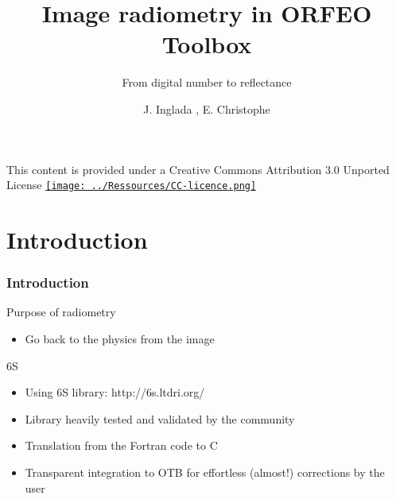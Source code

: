 \documentclass[compress]{beamer}
\title{Image radiometry in ORFEO Toolbox}
\subtitle
{From digital number to reflectance} %
\author
{J. Inglada\inst{1} , E. Christophe\inst{2}}
\institute[Cesbio, Crisp] %
{\inst{1}\textsc{Centre d'Études Spatiales de la Biosphère, Toulouse, France}
\and
\inst{2}\textsc{Centre for Remote Imaging, Sensing and Processing,\\ National University of Singapore}
}
\date{}
\begin{document}
\begin{frame}
  \titlepage
{\tiny This content is provided under a Creative Commons
  Attribution 3.0 Unported License} \href{http://creativecommons.org/licenses/by/3.0/}{\texttt{[image: ../Ressources/CC-licence.png]}}
\end{frame}

\section*{Introduction}

\begin{frame}

  \frametitle{Introduction}
  \begin{block}{Purpose of radiometry}
   \begin{itemize}
   \item Go back to the physics from the image
   \end{itemize}
  \end{block}
  \begin{block}{6S}
   \begin{itemize}
    \item Using 6S library: http://6s.ltdri.org/
    \item Library heavily tested and validated by the community
    \item Translation from the Fortran code to C
    \item Transparent integration to OTB for effortless (almost!) corrections by the user
   \end{itemize}
  \end{block}

\end{frame}
\end{document}
